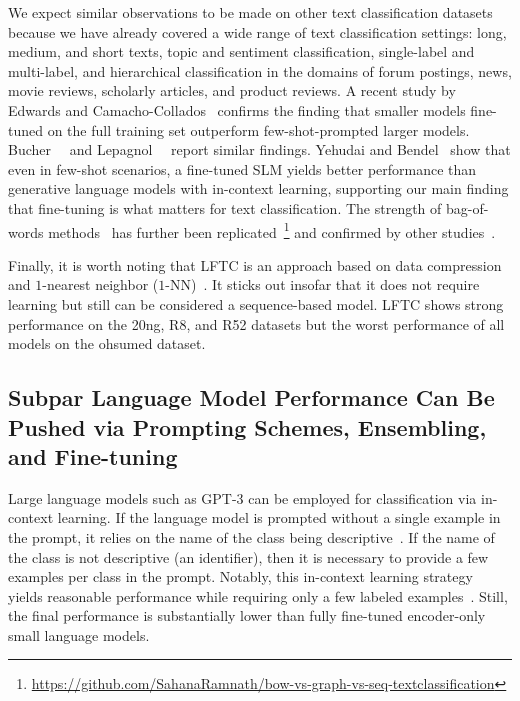 \documentclass[acmsmall,nonacm]{acmart}
\newcommand{\GenLMs}{generative language models\xspace}
\newcommand{\SLM}{SLM\xspace}
\begin{document}
We expect similar observations to be made on other text classification datasets because we have already covered a wide range of text classification settings: 
long, medium, and short texts, topic and sentiment classification, single-label and multi-label, and hierarchical classification in the domains of forum postings, news, movie reviews, scholarly articles, and product reviews. A recent study by Edwards and Camacho-Collados~\cite{edwards2024language} confirms the finding that smaller models fine-tuned on the full training set outperform few-shot-prompted larger models. 
Bucher~\etal~\cite{bucher2024finetunedsmallllmsstill} and Lepagnol~\etal~\cite{lepagnol2024smalllanguagemodelsgood} report similar findings.
Yehudai and Bendel~\cite{yehudai2024fastfit} show that even in few-shot scenarios, a fine-tuned \SLM yields better performance than \GenLMs with in-context learning,
supporting our main finding that fine-tuning is what matters for text classification.
The strength of bag-of-words methods~\cite{galkescherp-acl2022} has further been replicated~\cite{usc-students}\footnote{\url{https://github.com/SahanaRamnath/bow-vs-graph-vs-seq-textclassification}}
and confirmed by other studies~\cite{DBLP:journals/debu/ZhangLDXSM21}.

Finally, it is worth noting that LFTC is an approach based on data compression and $1$-nearest neighbor ($1$-NN)~\cite{mao2024lowresourcefasttextclassification}.
It sticks out insofar that it does not require learning but still can be considered a sequence-based model.
LFTC shows strong performance on the 20ng, R8, and R52 datasets but the worst performance of all models on the ohsumed dataset.

\subsection{Subpar Language Model Performance Can Be Pushed via Prompting Schemes, Ensembling, and Fine-tuning}
Large language models such as GPT-3 can be employed for classification via in-context learning.  If the language model is prompted without a single example in the prompt, it relies on the name of the class being descriptive~\cite{DBLP:journals/csur/Sebastiani02}. 
If the name of the class is not descriptive (\eg an identifier), then it is necessary to provide a few examples per class in the prompt. Notably, this in-context learning strategy yields reasonable performance while requiring only a few labeled examples~\cite{carp,DBLP:journals/corr/abs-2402-07470-pushing-the-limit}. 
Still, the final performance is substantially lower than fully fine-tuned encoder-only small language models.
\end{document}

